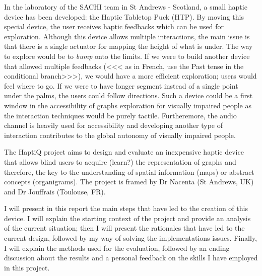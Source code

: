In the laboratory of the SACHI team in St Andrews - Scotland, a small haptic device has been developed: the Haptic Tabletop Puck (HTP). By moving this special device, the user receives haptic feedbacks which can be used for exploration. Although this device allows multiple interactions, the main issue is that there is a single actuator for
mapping the height of what is under. The way to explore would be to \emph{bump} onto the limits. If we were to build another device that allowed multiple feedbacks (<<< as in French, use the Past tense in the conditional branch>>>), we would have a more efficient exploration; users would feel where to go. If we were to have longer segment instead of a single point under the palms, the users could follow directions. Such a device could be a first window in the accessibility of graphs exploration for visually impaired people as the interaction techniques would be purely tactile. Furtheremore, the audio channel is heavily used for accessibility and developing another type of interaction
contributes to the global autonomy of visually impaired people.

The HaptiQ project aims to design and evaluate an inexpensive haptic device that allows blind users to acquire (learn?) the representation of graphs and therefore, the key to the understanding of spatial information (maps) or abstract concepts (organigrams). The project is framed by Dr Nacenta (St Andrews, UK) and Dr Jouffrais (Toulouse, FR).

I will present in this report the main steps that have led to the creation of this device. I will explain the starting context of the project and provide an analysis of the current situation; then I will present the rationales that have led to the current design, followed by my way of solving the implementations issues. Finally, I will explain the methods used for the evaluation, followed by an ending discussion about the results and a personal feedback on the skills I have employed in this project.
